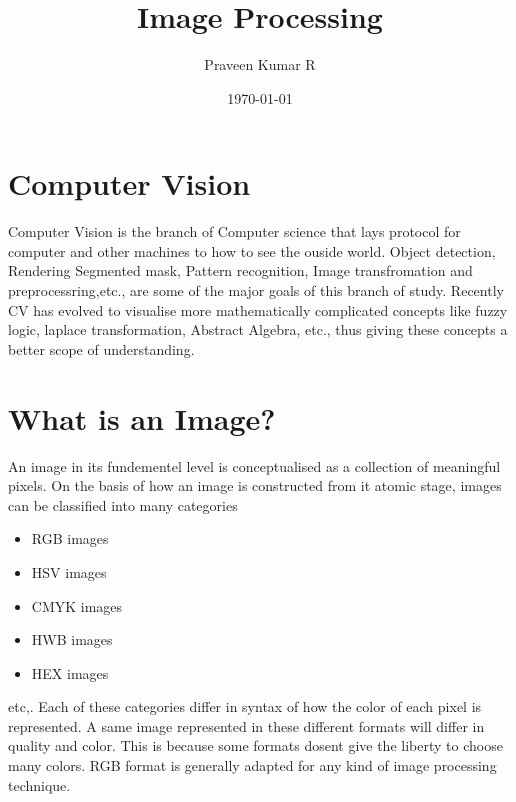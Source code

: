 \documentclass[11pt]{article}
\author{Praveen Kumar R}
\date{\today}
\title{Image Processing}
\begin{document}
\maketitle
\section{Computer Vision}
\label{sec-1}
Computer Vision is the branch of Computer science that lays protocol for computer and    
other machines to how to see the ouside world. Object detection, Rendering Segmented mask,    
Pattern recognition, Image transfromation and preprocessring,etc., are some of the major   
goals of this branch of study. Recently CV has evolved to visualise more mathematically    
complicated concepts like fuzzy logic, laplace transformation, Abstract Algebra, etc.,    
thus giving these concepts a better scope of understanding.

\section{What is an Image?}
\label{sec-2}
An image in its fundementel level is conceptualised as a collection of meaningful pixels.   
On the basis of how an image is constructed from it atomic stage, images can be classified   
into many categories
\begin{itemize}
\item RGB images
\item HSV images
\item CMYK images
\item HWB images
\item HEX images
\end{itemize}
etc,.
Each of these categories differ in syntax of how the color of each pixel is represented. A same image   
represented in these different formats will differ in quality and color. This is because some   
formats dosent give the liberty to choose many colors. RGB format is generally adapted   
for any kind of image processing technique.   
\end{document}
